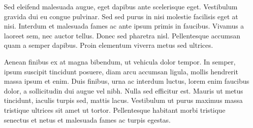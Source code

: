 \documentclass[10pt, a4paper]{article}
\theoremstyle{theorem-style}
\theoremstyle{definition-style}
\theoremstyle{remark-style}
\theoremstyle{example-style}
\theoremstyle{definition-style}
\theoremstyle{remark-style}
\begin{document}
Sed eleifend malesuada augue, eget dapibus ante scelerisque eget. Vestibulum gravida dui eu congue pulvinar. Sed sed purus in nisi molestie facilisis eget at nisi. Interdum et malesuada fames ac ante ipsum primis in faucibus. Vivamus a laoreet sem, nec auctor tellus. Donec sed pharetra nisl. Pellentesque accumsan quam a semper dapibus. Proin elementum viverra metus sed ultrices.

Aenean finibus ex at magna bibendum, ut vehicula dolor tempor. In semper, ipsum suscipit tincidunt posuere, diam arcu accumsan ligula, mollis hendrerit massa ipsum et enim. Duis finibus, urna ac interdum luctus, lorem enim faucibus dolor, a sollicitudin dui augue vel nibh. Nulla sed efficitur est. Mauris ut metus tincidunt, iaculis turpis sed, mattis lacus. Vestibulum ut purus maximus massa tristique ultrices sit amet ut tortor. Pellentesque habitant morbi tristique senectus et netus et malesuada fames ac turpis egestas.
\end{document}
